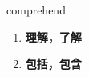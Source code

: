 
\begin{frame}
{\huge comprehend}
\begin{center}
\begin{enumerate}\Large
  \item \textbf{理解，了解}
  \item \textbf{包括，包含}
\end{enumerate}
\end{center}
\end{frame}
